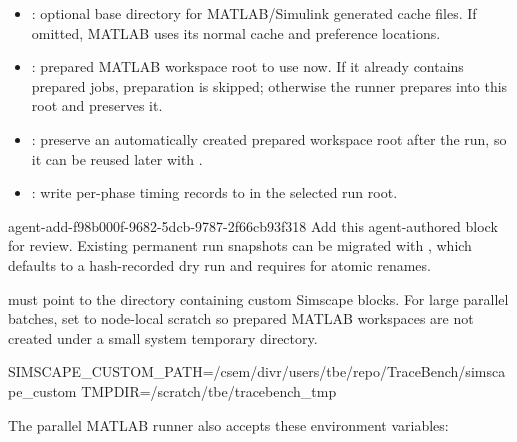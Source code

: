 \documentclass[11pt]{article}
\begin{document}
\begin{itemize}
\item {}: optional base directory for MATLAB/Simulink generated cache files. If omitted, MATLAB uses its
normal cache and preference locations.
\item {}: prepared MATLAB workspace root to use now. If it already contains prepared jobs,
preparation is skipped; otherwise the runner prepares into this root and preserves it.
\item {}: preserve an automatically created prepared workspace root after the run, so it can be
reused later with .
\item {}: write per-phase timing records to  in the selected run root.
\end{itemize}

\agentProposedEdit
  {agent-add-f98b000f-9682-5dcb-9787-2f66cb93f318}
  {Add this agent-authored block for review.}
  {}
  {Existing permanent run snapshots can be migrated with , which defaults to a hash-recorded dry run and requires  for atomic renames.}

 must point to the directory containing custom Simscape blocks.
For large parallel batches, set  to node-local scratch so prepared MATLAB workspaces are not created under a small
system temporary directory.

\begin{DocCode}
SIMSCAPE_CUSTOM_PATH=/csem/divr/users/tbe/repo/TraceBench/simscape_custom
TMPDIR=/scratch/tbe/tracebench_tmp
\end{DocCode}

The parallel MATLAB runner also accepts these environment variables:
\end{document}
